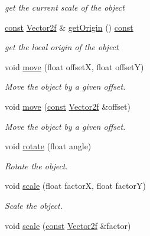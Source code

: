 \begin{DoxyCompactItemize}
\begin{DoxyCompactList}\small\item\em get the current scale of the object \end{DoxyCompactList}\item 
\hyperlink{term__entry_8h_a57bd63ce7f9a353488880e3de6692d5a}{const} \hyperlink{namespacesf_a80cea3c46537294fd1d8d428566ad8b2}{Vector2f} \& \hyperlink{classsf_1_1_transformable_a6bddc485d22bb64449d9d2d3a99a778f}{get\-Origin} () \hyperlink{term__entry_8h_a57bd63ce7f9a353488880e3de6692d5a}{const} 
\begin{DoxyCompactList}\small\item\em get the local origin of the object \end{DoxyCompactList}\item 
void \hyperlink{classsf_1_1_transformable_a86b461d6a941ad390c2ad8b6a4a20391}{move} (float offset\-X, float offset\-Y)
\begin{DoxyCompactList}\small\item\em Move the object by a given offset. \end{DoxyCompactList}\item 
void \hyperlink{classsf_1_1_transformable_ab9ca691522f6ddc1a40406849b87c469}{move} (\hyperlink{term__entry_8h_a57bd63ce7f9a353488880e3de6692d5a}{const} \hyperlink{namespacesf_a80cea3c46537294fd1d8d428566ad8b2}{Vector2f} \&offset)
\begin{DoxyCompactList}\small\item\em Move the object by a given offset. \end{DoxyCompactList}\item 
void \hyperlink{classsf_1_1_transformable_af8a5ffddc0d93f238fee3bf8efe1ebda}{rotate} (float angle)
\begin{DoxyCompactList}\small\item\em Rotate the object. \end{DoxyCompactList}\item 
void \hyperlink{classsf_1_1_transformable_a3de0c6d8957f3cf318092f3f60656391}{scale} (float factor\-X, float factor\-Y)
\begin{DoxyCompactList}\small\item\em Scale the object. \end{DoxyCompactList}\item 
void \hyperlink{classsf_1_1_transformable_adecaa6c69b1f27dd5194b067d96bb694}{scale} (\hyperlink{term__entry_8h_a57bd63ce7f9a353488880e3de6692d5a}{const} \hyperlink{namespacesf_a80cea3c46537294fd1d8d428566ad8b2}{Vector2f} \&factor)

\end{DoxyCompactItemize}
